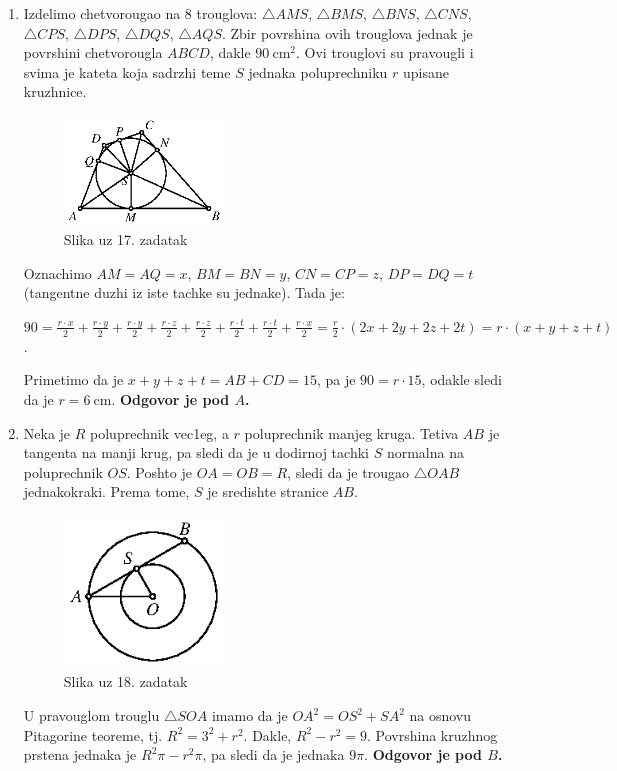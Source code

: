 \documentclass[a4paper,12pt]{article}
\begin{document}
\begin{enumerate}[1.]
\item Izdelimo chetvorougao na 8 trouglova: $\triangle AMS$, $\triangle BMS$, $\triangle BNS$, $\triangle CNS$, $\triangle CPS$, $\triangle DPS$, $\triangle DQS$, $\triangle AQS$. Zbir povrshina ovih trouglova jednak je povrshini chetvorougla $ABCD$, dakle $90\mathrm{\ cm}^2$. Ovi trouglovi su pravougli i svima je kateta koja sadrzhi teme $S$ jednaka poluprechniku $r$ upisane kruzhnice.

\begin{figure}[h!]
\begin{center}
\includegraphics[width=0.4\textwidth]{sl8.eps}
\caption{Slika uz 17. zadatak}
\end{center}
\end{figure}

Oznachimo $AM=AQ=x$, $BM=BN=y$, $CN=CP=z$, $DP=DQ=t$ (tangentne duzhi iz iste tachke su jednake). Tada je:
\par $90=\frac{r \cdot x}{2}+\frac{r \cdot y}{2}+\frac{r \cdot y}{2}+\frac{r \cdot z}{2}+\frac{r \cdot z}{2}+\frac{r \cdot t}{2}+\frac{r \cdot t}{2}+\frac{r \cdot x}{2}=\frac{r}{2}\cdot(2x+2y+2z+2t)=r\cdot(x+y+z+t)$.
\par Primetimo da je $x+y+z+t=AB+CD=15$, pa je $90=r\cdot 15$, odakle sledi da je $r=6\mathrm{\ cm}$. \textbf{Odgovor je pod $A$.}

\item Neka je $R$ poluprechnik vec1eg, a $r$ poluprechnik manjeg kruga. Tetiva $AB$ je tangenta na manji krug, pa sledi da je u dodirnoj tachki $S$ normalna na poluprechnik $OS$. Poshto je $OA=OB=R$, sledi da je trougao $\triangle OAB$ jednakokraki. Prema tome, $S$ je sredishte stranice $AB$.
\begin{figure}[h!]
\begin{center}
\includegraphics[width=0.4\textwidth]{sl7.eps}
\caption{Slika uz 18. zadatak}
\end{center}
\end{figure}
\par U pravouglom trouglu $\triangle SOA$ imamo da je $OA^2=OS^2+SA^2$ na osnovu Pitagorine teoreme, tj. $R^2=3^2+r^2$. Dakle, $R^2-r^2=9$. Povrshina kruzhnog prstena jednaka je $R^2\pi-r^2\pi$, pa sledi da je jednaka $9\pi$. \textbf{Odgovor je pod $B$.}


\end{enumerate}
\end{document}
